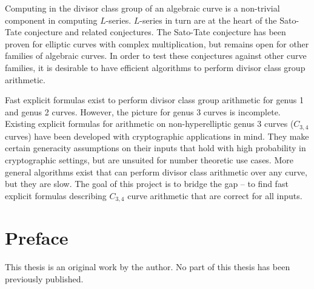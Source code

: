\documentclass{ucalgarythesis}
\theoremstyle{plain}
\theoremstyle{definition}
\begin{document}

\begin{thesisabstract}  

Computing in the divisor class group of an algebraic curve is a non-trivial component in computing $L$-series.
$L$-series in turn are at the heart of the Sato-Tate conjecture and related conjectures.
The Sato-Tate conjecture has been proven for elliptic curves with complex multiplication,
but remains open for other families of algebraic curves.
In order to test these conjectures against other curve families, it is desirable to have efficient algorithms to perform divisor class group arithmetic.

Fast explicit formulas exist to perform divisor class group arithmetic for genus 1 and genus 2 curves.
However, the picture for genus 3 curves is incomplete.
Existing explicit formulas for arithmetic on non-hyperelliptic genus 3 curves ($C_{3,4}$ curves) have been developed with cryptographic applications in mind.
They make certain generacity assumptions on their inputs that hold with high probability in cryptographic settings,
but are unsuited for number theoretic use cases.
More general algorithms exist that can perform divisor class arithmetic over any curve, but they are slow.
The goal of this project is to bridge the gap --
to find fast explicit formulas describing $C_{3,4}$ curve arithmetic that are correct for all inputs.

\end{thesisabstract}




  \chapter{Preface}
 
  This thesis is an original work by the author. No part of this thesis has been previously published.
 
   
\end{document}
